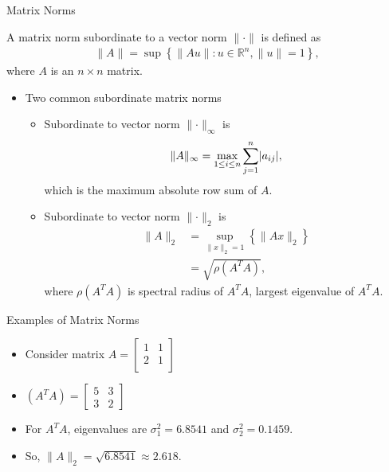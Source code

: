 \documentclass[9pt, serif]{beamer}
\newlength{\wideitemsep}
\let\olditem\item
\renewcommand{\item}{\setlength{\itemsep}{\wideitemsep}\olditem}
\newcommand{\bi}{\begin{itemize}}
\newcommand{\ei}{\end{itemize}}
\newcommand{\abs}[1]{\lvert#1\rvert}
\newcommand{\norm}[1]{\lVert#1\rVert}
\begin{document}
\begin{frame}{Matrix Norms}
    \begin{definition}
        A matrix norm subordinate to a vector norm $\norm{\cdot}$ is defined as
        \begin{align*}
            \norm{A} = \sup\left\{\norm{Au} : u\in\mathbb{R}^n , \norm{u} = 1\right\},
        \end{align*}
        where $A$ is an $n\times n$ matrix.
    \end{definition}
    \pause
    \bi
        \item Two common subordinate matrix norms
        \pause
        \bi
            \item Subordinate to vector norm $\norm{\cdot}_\infty$ is
            \begin{align*}
                \norm{A}_\infty = \smash{\displaystyle\max_{1 \leq i \leq n}} \sum\limits_{j=1}^n \abs{a_{ij}},
            \end{align*}
            which is the maximum absolute row sum of $A$.
            \pause

            \item Subordinate to vector norm $\norm{\cdot}_2$ is
            \begin{align*}
                \norm{A}_2 &= \sup\limits_{\norm{x}_2=1} \left\{\norm{Ax}_2\right\}\\
                &= \sqrt{\rho(A^TA)},
            \end{align*}
            where $\rho(A^TA)$ is spectral radius of $A^TA$, largest eigenvalue of $A^TA$.
        \ei
    \ei
\end{frame}


\begin{frame}{Examples of Matrix Norms}
    \bi
        \item Consider matrix
        $A = \begin{bmatrix}
            1 & 1 \\
            2 & 1\\
        \end{bmatrix}$
        \pause
        \item$(A^TA) = \begin{bmatrix} 5 & 3 \\ 3 & 2 \end{bmatrix}$
        \pause
        \item For $A^TA$, eigenvalues are $\sigma^2_1 = 6.8541$ and $\sigma^2_2 = 0.1459$.
        \pause
        \item So, $\norm{A}_2 = \sqrt{6.8541} \approx 2.618$.
    \ei
\end{frame}
\end{document}
